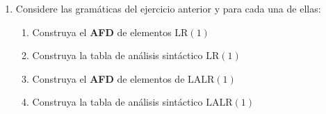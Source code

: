 \documentclass[12pt,letterpaper]{article}
\newcommand{\nt}[1]{\textit{#1}}
\newcommand{\tk}[1]{\texttt{#1}}
\newcommand{\tx}[1]{\text{#1}}
\newcommand{\Follow}[1]{\mathrm{FOLLOW}(#1)}
\newcommand{\lr}{\mathrm{LR(1)}}
\newcommand{\lrc}{\mathrm{LR(0)}}
\newcommand{\slr}{\mathrm{SLR(1)}}
\newcommand{\lalr}{\mathrm{LALR(1)}}
\begin{document}
\begin{enumerate}[label=\arabic*.]
  Revisamos cada estado buscando un elemento completo junto con un elemento que tenga un terminal después del
  punto ($d_N/r_J$) o dos elementos completos ($r_J/r_{J'}$).
  \begin{itemize}
  \item $I_0$ e $I_2$: el único elemento completo es $\nt{A}\to\bullet$, y los demás tienen el punto antes de
    \nt{A} (no es un desplazamiento), no hay conflicto.
  \item $I_1$: $\nt{A'}\to\nt{A}\,\bullet$ es \textit{aceptar} en la columna \tk{\$} (no es una reducción) y
    $\nt{A}\to\nt{A}\,\bullet\,\tk{(}\,\nt{A}\,\tk{)}$ desplaza con \tk{(}, son columnas distintas.
  \item $I_3$: solo desplazamientos (con \tk{)} y con \tk{(}).
  \item $I_4$: un único elemento completo.
  \end{itemize}
  
  No hay conflictos, por lo tanto \textbf{la gramática 2 es $\lrc$}.\\

  En $\lrc$ las reducciones van en todas las columnas de terminales; como aquí $\Follow{\tx{A}}$ ya contiene a
  \tk{(}, \tk{)} y \tk{\$}, la tabla coincide con la $\slr$:
  \[
  \begin{array}{c|c|c|c||c}
    & \multicolumn{3}{c||}{\textbf{acción}} & \textbf{goto} \\ \hline
    \text{Estado} & \tk{(} & \tk{)} & \tk{\$} & \nt{A} \\ \hline
    0 & r2 & r2 & r2 & 1 \\ \hline
    1 & d2 &    & \text{aceptar} &   \\ \hline
    2 & r2 & r2 & r2 & 3 \\ \hline
    3 & d2 & d4 &    &   \\ \hline
    4 & r1 & r1 & r1 &   \\
  \end{array}
  \]
  
  
\newpage


\item Considere las gramáticas del ejercicio anterior y para cada una de ellas:
  \begin{enumerate}[label=\alph*.]
    \item Construya el \textbf{AFD} de elementos $\lr$
    \item Construya la tabla de análisis sintáctico $\lr$
    \item Construya el \textbf{AFD} de elementos de $\lalr$
    \item Construya la tabla de análisis sintáctico $\lalr$
  \end{enumerate}
    

\end{enumerate}
\end{document}
